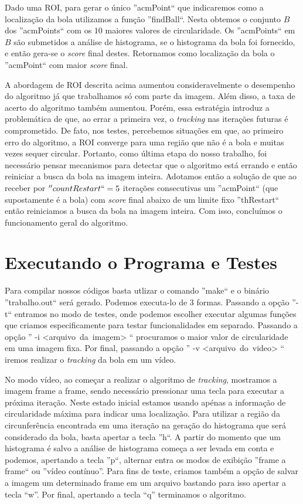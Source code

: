 \documentclass[11pt,a4paper]{article}
\begin{document}
 Dado uma ROI, para gerar o único ''acmPoint`` que indicaremos como a localização da bola utilizamos a função ''findBall``. Nesta obtemos o conjunto $B$ dos ''acmPoints`` com os $10$ maiores valores de circularidade. Os ''acmPoints`` em $B$ são submetidos a análise de histograma, se o histograma da bola foi fornecido, e então gera-se o \textit{score} final destes. Retornamos como localização da bola o ''acmPoint`` com maior \textit{score} final.

 A abordagem de ROI descrita acima aumentou consideravelmente o desempenho do algoritmo já que trabalhamos só com parte da imagem. Além disso, a taxa de acerto do algoritmo também aumentou. Porém, essa estratégia introduz a problemática de que, ao errar a primeira vez, o \textit{tracking} nas iterações futuras é comprometido. De fato, nos testes, percebemos situações em que, ao primeiro erro do algoritmo, a ROI converge para uma região que não é a bola e muitas vezes sequer circular. Portanto, como última etapa do nosso trabalho, foi necessário pensar mecanismos para detectar que o algoritmo está errando e então reiniciar a busca da bola na imagem inteira. Adotamos então a solução de que ao receber por $''countRestart``=5$ iterações consecutivas um ''acmPoint`` (que supostamente é a bola) com \textit{score} final abaixo de um limite fixo ''thRestart`` então reiniciamos a busca da bola na imagem inteira. Com isso, concluímos o funcionamento geral do algoritmo.

\section{Executando o Programa e Testes}

 Para compilar nossos códigos basta utlizar o comando ''make`` e o binário ''trabalho.out`` será gerado. Podemos executa-lo de $3$ formas. Passando a opção ''-t`` entramos no modo de testes, onde podemos escolher executar algumas funções que criamos especificamente para testar funcionalidades em separado. Passando a opção '' -i <arquivo~da~imagem> `` procuramos o maior valor de circularidade em uma imagem fixa. Por final, passando a opção '' -v <arquivo~do~video> `` iremos realizar o \textit{tracking} da bola em um vídeo.

 No modo vídeo, ao começar a realizar o algoritmo de \textit{tracking}, mostramos a imagem frame a frame, sendo necessário pressionar uma tecla para executar a próxima iteração. Neste estado inicial estamos usando apénas a informação de circularidade máxima para indicar uma localização. Para utilizar a região da circunferência encontrada em uma iteração na geração do histograma que será considerado da bola, basta apertar a tecla ''h``. A partir do momento que um histograma é salvo a análise de histograma começa a ser levada em conta e podemos, apertando a tecla ''p``, alternar entra os modos de exibição ''frame a frame`` ou ''vídeo contínuo''. Para fins de teste, criamos também a opção de salvar a imagem um determinado frame em um arquivo bastando para isso apertar a tecla ``w''. Por final, apertando a tecla ``q'' terminamos o algoritmo.
\end{document}

